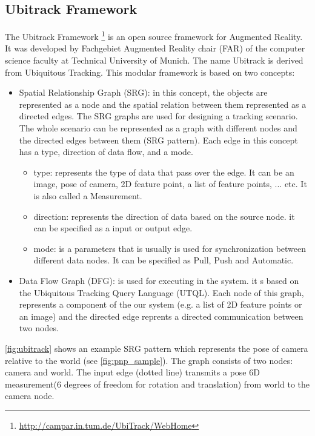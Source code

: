 \subsection{Ubitrack Framework} \label{sebsec:ubitrack}
The Ubitrack Framework \footnote {\url{http://campar.in.tum.de/UbiTrack/WebHome}} is an open source framework for Augmented Reality. It was developed by Fachgebiet Augmented Reality chair (FAR) of the computer science faculty at Technical University of Munich. The name Ubitrack is derived from Ubiquitous Tracking. This modular framework is based on two concepts:
\begin{itemize} 
\item Spatial Relationship Graph (SRG): in this concept, the objects are represented as a node and the spatial relation between them represented as a directed edges. The SRG graphs are used for designing a tracking scenario. The whole scenario can be represented as a graph with different nodes and the directed edges between them (SRG pattern). Each edge in this concept has a type, direction of data flow, and a mode. 
	\begin{itemize}
		\item type: represents the type of data that pass over the edge. It can be an image, pose of camera, 2D feature point, a list of feature points, ... etc. It is also called a Measurement.
		\item direction: represents the direction of data based on the source node. it can be specified as a input or output edge.
		\item mode: is a parameters that is usually is used for synchronization between different data nodes. It can be specified as Pull, Push and Automatic.
	\end{itemize}
\item Data Flow Graph (DFG): is used for executing in the system. it s based on the Ubiquitous Tracking Query Language (UTQL). Each node of this graph, represents a component of the our system (e.g. a list of 2D feature points or an image) and the directed edge reprents a directed communication between two nodes. 
\end{itemize}

 \autoref{fig:ubitrack} shows an example SRG pattern which represents the pose of camera relative to the world (see \autoref{fig:pnp_sample}). The graph consists of two nodes: camera and world. The input edge (dotted line) transmits a pose 6D measurement(6 degrees of freedom for rotation and translation) from world to the camera node.

